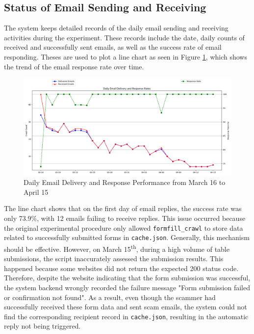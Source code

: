 \documentclass[ oneside,%
                    author={Cassie Qing Tang},
                    degree={BSc},
                     title={An Automated Response System for Disrupting Online Pet Scamming \\ },
                    subtitle={ }]{dissertation}
\begin{document}
\subsection{Status of Email Sending and Receiving}
The system keeps detailed records of the daily email sending and receiving activities during the experiment. These records include the date, daily counts of received and successfully sent emails, as well as the success rate of email responding. Theses are used to plot a line chart as seen in Figure \ref{fig:pic12}, which shows the trend of the email response rate over time.
\begin{figure}[H]
\centering
\includegraphics[width=\linewidth]{pic/figure12.png}
\caption{Daily Email Delivery and Response Performance from March 16 to April 15}
\label{fig:pic12}
\end{figure}

The line chart shows that on the first day of email replies, the success rate was only 73.9\%, with 12 emails failing to receive replies. This issue occurred because the original experimental procedure only allowed \texttt{formfill\_crawl} to store data related to successfully submitted forms in \texttt{cache.json}. Generally, this mechanism should be effective. However, on March 15\textsuperscript{th}, during a high volume of table submissions, the script inaccurately assessed the submission results. This happened because some websites did not return the expected 200 status code. Therefore, despite the website indicating that the form submission was successful, the system backend wrongly recorded the failure message "Form submission failed or confirmation not found". As a result, even though the scammer had successfully received these form data and sent scam emails, the system could not find the corresponding recipient record in \texttt{cache.json}, resulting in the automatic reply not being triggered.
\\
\end{document}
